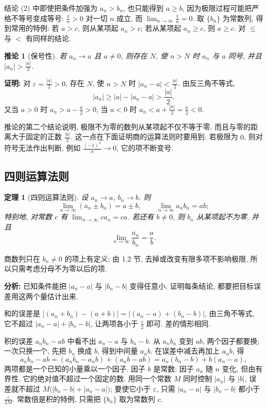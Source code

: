\documentclass[UTF8,openany]{ctexbook}
\theoremstyle{chinesetextbook}
\newtheorem{theorem}{定理}[section]
\newenvironment{cnproof}{\par\indent\textbf{证明:} \ignorespaces}{\par}
\newtheorem*{corollarysingle}{推论}
\begin{document}
结论 (2) 中即使把条件加强为 $a_n>b_n$, 也只能得到 $a\ge b$, 因为极限过程可能把严格不等号变成等号: $\displaystyle\frac1n>0$ 对一切 $n$ 成立, 而 $\displaystyle\lim_{n\to\infty}\frac1n=0$. 取 $\{b_n\}$ 为常数列, 得到常用的特例: 若 $a>c$, 则从某项起 $a_n>c$; 若从某项起 $a_n\ge c$, 则 $a\ge c$. 对 $\le$ 与 $<$ 有同样的结论.
\begin{corollarysingle}[保号性]
若 $a_n\to a$ 且 $a\ne0$, 则存在 $N$, 使 $n>N$ 时 $a_n$ 与 $a$ 同号, 并且 $\displaystyle|a_n|>\frac{|a|}2$.
\end{corollarysingle}
\begin{cnproof}
对 $\displaystyle\varepsilon=\frac{|a|}2>0$, 存在 $N$, 使 $n>N$ 时 $\displaystyle|a_n-a|<\frac{|a|}2$. 由反三角不等式,
\[
|a_n|\ge|a|-|a_n-a|>\frac{|a|}2.
\]
又当 $a>0$ 时 $\displaystyle a_n>a-\frac a2>0$, 当 $a<0$ 时 $\displaystyle a_n<a+\frac{|a|}2=\frac a2<0$.
\end{cnproof}
推论的第二个结论说明, 极限不为零的数列从某项起不仅不等于零, 而且与零的距离大于固定的正数 $\displaystyle\frac{|a|}2$. 这一点在下面证明商的运算法则时要用到. 若极限为 $0$, 则对符号无法作出判断, 例如 $\displaystyle\frac{(-1)^n}n\to0$, 它的项不断变号.
\subsection{四则运算法则}
\begin{theorem}[四则运算法则]
设 $a_n\to a$, $b_n\to b$. 则
\[
\lim_{n\to\infty}(a_n\pm b_n)=a\pm b,\qquad \lim_{n\to\infty}a_nb_n=ab;
\]
特别地, 对常数 $c$ 有 $\displaystyle\lim_{n\to\infty}ca_n=ca$. 若还有 $b\ne0$, 则 $b_n$ 从某项起不为零, 并且
\[
\lim_{n\to\infty}\frac{a_n}{b_n}=\frac ab.
\]
\end{theorem}
商数列只在 $b_n\ne0$ 的项上有定义; 由 1.2 节, 去掉或改变有限多项不影响极限, 所以只需考虑分母不为零以后的项.

\par\indent\textbf{分析:} 已知条件能把 $|a_n-a|$ 与 $|b_n-b|$ 变得任意小. 证明每条结论, 都要把目标误差用这两个量估计出来.

和的误差是 $|(a_n+b_n)-(a+b)|=|(a_n-a)+(b_n-b)|$, 由三角不等式, 它不超过 $|a_n-a|+|b_n-b|$, 让两项各小于 $\displaystyle\frac\varepsilon2$ 即可. 差的情形相同.

积的误差 $a_nb_n-ab$ 中看不出 $a_n-a$ 与 $b_n-b$. 从 $a_nb_n$ 变到 $ab$, 两个因子都要换; 一次只换一个, 先把 $b_n$ 换成 $b$, 得到中间量 $a_nb$. 在误差中减去再加上 $a_nb$, 得
\[
a_nb_n-ab=(a_nb_n-a_nb)+(a_nb-ab)=a_n(b_n-b)+b(a_n-a),
\]
两项都是一个已知的小量乘以一个因子. 因子 $b$ 是常数; 因子 $a_n$ 随 $n$ 变化, 但由有界性, 它的绝对值不超过一个固定的数. 用同一个常数 $M$ 同时控制 $|a_n|$ 与 $|b|$, 误差就不超过 $M\bigl(|b_n-b|+|a_n-a|\bigr)$; 要使它小于 $\varepsilon$, 只需 $|a_n-a|$ 与 $|b_n-b|$ 都小于 $\displaystyle\frac\varepsilon{2M}$. 常数倍是积的特例, 只需把 $\{b_n\}$ 取为常数列 $c$.
\end{document}

